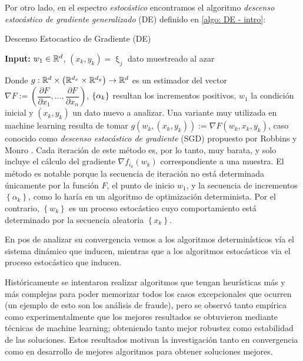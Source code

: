 Por otro lado, en el espectro \textit{estoc\'astico} encontramos el algoritmo \textit{descenso estoc\'astico de gradiente generalizado} (DE) definido en \ref{algo: DE - intro}:

 \LinesNumbered
 \begin{algorithm}[H]
 	\caption{Descenso Estocastico de Gradiente (DE) \label{algo: DE - intro}}
 	\textbf{Input:} $w_1 \in {\mathbb{R}}^d$, $(x_k, y_k) = \upxi_j$ dato muestreado al azar\\
 \end{algorithm}

Donde $g : {\mathbb{R}}^d \times \left( {\mathbb{R}}^{d_x} \times {\mathbb{R}}^{d_y} \right) \rightarrow {\mathbb{R}}^d$ es un estimador del vector $\nabla F := \left(\dfrac{\partial F}{\partial x_1}, \dots, \dfrac{\partial F}{\partial x_n}\right)$, $\left\lbrace\alpha_k\right\rbrace$ resultan los incrementos positivos, $w_1$ la condici\'on inicial y $(x_k, y_k)$ un dato nuevo a analizar. Una variante muy utilizada en machine learning resulta de tomar $g(w_k, \left(x_k, y_k\right)) := \nabla F(w_k, x_k, y_k)$, caso conocido como \textit{descenso estoc\'astico de gradiente} (SGD) propuesto por Robbins y Monro \cite{robbins:1951}. Cada iteraci\'on de este m\'etodo es, por lo tanto, muy barata, y solo incluye el c\'alculo del gradiente $\nabla f_{i_k} (w_k)$ correspondiente a una muestra. El m\'etodo es notable porque la secuencia de iteraci\'on no est\'a determinada \'unicamente por la funci\'on $F$, el punto de inicio $w_1$, y la secuencia de incrementos $\left\lbrace \alpha _k \right\rbrace $, como lo har\'ia en un algoritmo de optimizaci\'on determinista. Por el contrario, $\left\lbrace w_k \right\rbrace $ es un proceso estoc\'astico cuyo comportamiento est\'a determinado por la secuencia aleatoria $\left\lbrace x_k \right\rbrace $.

En pos de analizar su convergencia vemos a los algoritmos determin\'isticos v\'ia el sistema din\'amico que inducen, mientras que a los algoritmos estoc\'asticos via el proceso estoc\'astico que inducen.

Hist\'oricamente se intentaron realizar algoritmos que tengan heur\'isticas m\'as y m\'as complejas para poder memorizar todos los casos excepcionales que ocurren (un ejemplo de esto son los an\'alisis de fraude), pero se observ\'o tanto emp\'irica como experimentalmente que los mejores resultados se obtuvieron mediante t\'ecnicas de machine learning; obteniendo tanto mejor robustez como estabilidad de las soluciones. Estos resultados motivan la investigaci\'on tanto en convergencia como en desarrollo de mejores algoritmos para obtener soluciones mejores.

